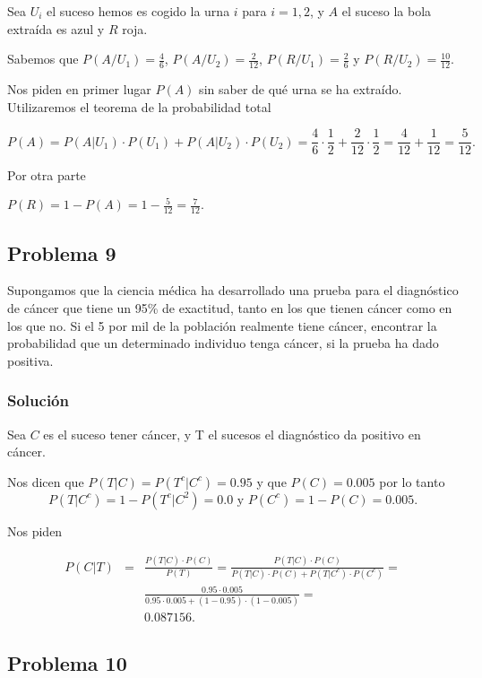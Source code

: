 \documentclass[
]{article}
\begin{document}
Sea \(U_i\) el suceso hemos es cogido la urna \(i\) para \(i=1,2\), y
\(A\) el suceso la bola extraída es azul y \(R\) roja.

Sabemos que \(P(A/U_1)=\frac{4}{6}\), \(P(A/U_2)=\frac{2}{12}\),
\(P(R/U_1)=\frac{2}{6}\) y \(P(R/U_2)=\frac{10}{12}.\)

Nos piden en primer lugar \(P(A)\) sin saber de qué urna se ha extraído.
Utilizaremos el teorema de la probabilidad total

\[
P(A)=P(A|U_1)\cdot P(U_1)+P(A|U_2)\cdot P(U_2)=
\frac{4}{6}\cdot \frac{1}{2}+\frac{2}{12}\cdot \frac{1}{2}
=\frac{4}{12}+\frac{1}{12}=\frac{5}{12}.
\]

Por otra parte

\(P(R)=1-P(A)=1-\frac{5}{12}=\frac{7}{12}.\)

\hypertarget{problema-9}{%
\subsection{Problema 9}\label{problema-9}}

Supongamos que la ciencia médica ha desarrollado una prueba para el
diagnóstico de cáncer que tiene un 95\% de exactitud, tanto en los que
tienen cáncer como en los que no. Si el 5 por mil de la población
realmente tiene cáncer, encontrar la probabilidad que un determinado
individuo tenga cáncer, si la prueba ha dado positiva.

\hypertarget{soluciuxf3n-9}{%
\subsubsection{Solución}\label{soluciuxf3n-9}}

Sea \(C\) es el suceso tener cáncer, y T el sucesos el diagnóstico da
positivo en cáncer.

Nos dicen que \(P(T|C)=P(T^c|C^c)=0.95\) y que \(P(C)=0.005\) por lo
tanto \[P(T|C^c)=1-P(T^c|C^2)=0.0 \mbox{ y } P(C^c)=1-P(C)=0.005.\]

Nos piden

\begin{eqnarray*}
P(C|T)&=&\frac{P(T|C)\cdot P(C)}{P(T)}= 
\frac{P(T|C)\cdot P(C)}{P(T|C)\cdot P(C)+P(T|C^c)\cdot P(C^c)} =\\
&&\frac{0.95\cdot 0.005}{0.95\cdot 0.005+(1-0.95)\cdot (1-0.005)}=\\
&&
0.087156. 
\end{eqnarray*}

\hypertarget{problema-10}{%
\subsection{Problema 10}\label{problema-10}}
\end{document}
